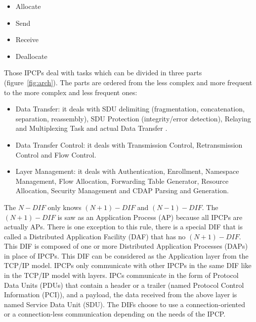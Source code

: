 \documentclass[a4paper]{proc}
\begin{document}
\begin{itemize}
    \item Allocate
    \item Send
    \item Receive
    \item Deallocate
\end{itemize}

Those IPCPs deal with tasks which can be divided in three parts (figure~\ref{fig:arch}).
The parts are ordered from the less complex and more frequent
to the more complex and less frequent ones:

\begin{itemize}
    \item Data Transfer: it deals with SDU delimiting (fragmentation,
        concatenation, separation, reassembly), SDU Protection (integrity/error
        detection), Relaying and Multiplexing Task and actual Data Transfer
        \cite{irati}.
    \item Data Transfer Control: it deals with Transmission Control,
        Retransmission Control and Flow Control.
    \item Layer Management: it deals with Authentication, Enrollment, Namespace
        Management, Flow Allocation, Forwarding Table Generator, Resource
        Allocation, Security Management and CDAP Parsing and Generation.
\end{itemize}

The $N-DIF$ only knows $(N + 1)-DIF$ and $(N - 1)-DIF$\@.  The $(N + 1)-DIF$ is
saw as an Application Process (AP) because all IPCPs are actually APs.  There is
one exception to this rule, there is a special DIF that is called a Distributed
Application Facility (DAF) that has no $(N + 1)-DIF$\@.  This DIF is composed of
one or more Distributed Application Processes (DAPs) in place of IPCPs.  This
DIF can be considered as the Application layer from the TCP/IP model.  IPCPs
only communicate with other IPCPs in the same DIF like in the TCP/IP model with
layers.  IPCs communicate in the form of Protocol Data Units (PDUs) that contain
a header or a trailer (named Protocol Control Information (PCI)), and a
payload, the data received from the above layer is named Service Data Unit (SDU).
\cite{PINS} The DIFs choose to use a connection-oriented or a
connection-less communication depending on the needs of the IPCP\@.
\end{document}

